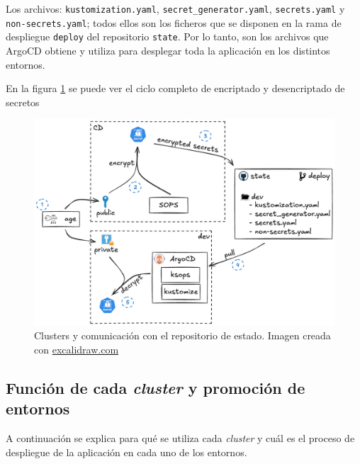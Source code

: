 Los archivos: \texttt{kustomization.yaml}, \texttt{secret\_generator.yaml}, \texttt{secrets.yaml} y \texttt{non-secrets.yaml}; todos ellos son los ficheros que se disponen en la rama de despliegue \texttt{deploy} del repositorio \texttt{state}. Por lo tanto, son los archivos que ArgoCD obtiene y utiliza para desplegar toda la aplicación en los distintos entornos.

En la figura \ref{fig:secrets} se puede ver el ciclo completo de encriptado y desencriptado de secretos

\begin{figure}
  \centerline{\includegraphics[width=13.5cm]{figuras/secrets}}
  \caption{Clusters y comunicación con el repositorio de estado. Imagen creada con \href{https://excalidraw.com}{excalidraw.com}}
  \label{fig:secrets}
\end{figure}

\subsection*{Función de cada \textit{cluster} y promoción de entornos}
\label{subsec:clusters}

A continuación se explica para qué se utiliza cada \textit{cluster} y cuál es el proceso de despliegue de la aplicación en cada uno de los entornos.

